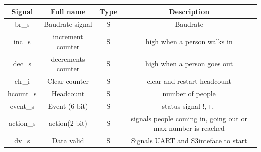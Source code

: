 \documentclass{article}
\begin{document}
    \begin{center}
         \begin{tabular}{|c|c|c|c|}
         \hline
        Signal& Full name & Type& Description \\
        \hline
        \hline
       
        \hline 
        br\_s&  Baudrate signal & S &  Baudrate \\
        \hline
        inc\_s & increment counter & S & high when a person walks in\\
        \hline
        dec\_s& decrements counter & S & high when a person goes out \\
        \hline
        clr\_i & Clear counter & S & clear and restart headcount \\
        \hline 
         hcount\_s & Headcount & S & number of people  \\
        \hline
        event\_s & Event (6-bit) & S&  status signal !,+,- \\
        \hline 
        action\_s  & action(2-bit) & S& signals people coming in, going out or max number is reached\\
        \hline
        dv\_s  & Data valid & S& Signals UART and S3inteface to start\\
        \hline
        
           \end{tabular}
    \end{center}  
    
    \newpage

    

\newpage
\end{document}
